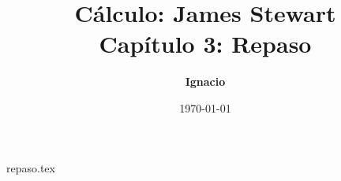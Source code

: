 \documentclass[11pt,spanish,oneside]{report}
\title{\textbf{Cálculo: James Stewart} \\ \Large Capítulo 3: Repaso}
\author{\textbf{Ignacio}}
\date{\today}
\begin{document}
\maketitle

{repaso.tex}
\end{document}
